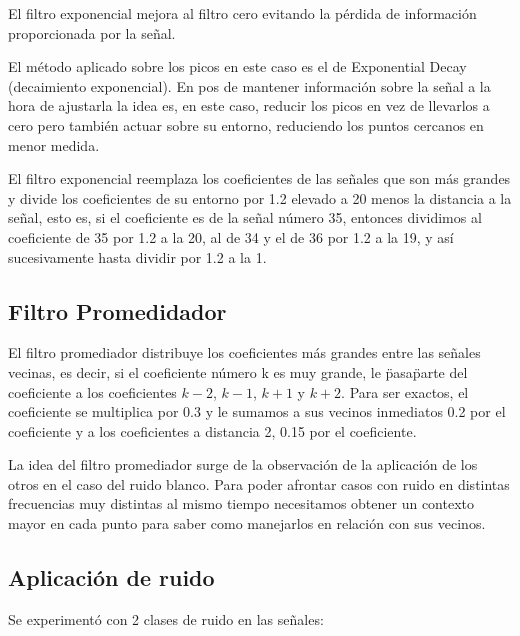 El filtro exponencial mejora al filtro cero evitando la p\'erdida de
informaci\'on proporcionada por la se\~nal.

El m\'etodo aplicado sobre los picos en este caso es el de Exponential Decay
(decaimiento exponencial). En pos de mantener informaci\'on sobre la se\~nal a
la hora de ajustarla la idea es, en este caso, reducir los picos en vez de
llevarlos a cero pero tambi\'en actuar sobre su entorno, reduciendo los puntos
cercanos en menor medida.

El filtro exponencial reemplaza los coeficientes de las se\~nales que son m\'as 
grandes y divide los coeficientes de su entorno por 1.2 elevado a 20 menos 
la distancia a la se\~nal, esto es, si el coeficiente es de la se\~nal n\'umero 
35, entonces dividimos al coeficiente de 35 por 1.2 a la 20, al de 34 y el de 
36 por 1.2 a la 19, y as\'i sucesivamente hasta dividir por 1.2 a la 1.

\subsection{Filtro Promedidador}

El filtro promediador distribuye los coeficientes m\'as grandes 
entre las se\~nales vecinas, es decir, si el coeficiente n\'umero k es muy 
grande, le \"pasa\" parte del coeficiente a los coeficientes $k-2$, $k-1$, $k+1$ y
$k+2$. Para ser exactos, el coeficiente se multiplica por 0.3 y le sumamos a sus 
vecinos inmediatos 0.2 por el coeficiente y a los coeficientes a distancia 2, 0.15 
por el coeficiente.

La idea del filtro promediador surge de la observaci\'on de la aplicaci\'on de
los otros en el caso del ruido blanco. Para poder afrontar casos con ruido en
distintas frecuencias muy distintas al mismo tiempo necesitamos obtener un
contexto mayor en cada punto para saber como manejarlos en relaci\'on con sus
vecinos.

\subsection{Aplicaci\'on de ruido}

Se experiment\'o con 2 clases de ruido en las se\~nales:

